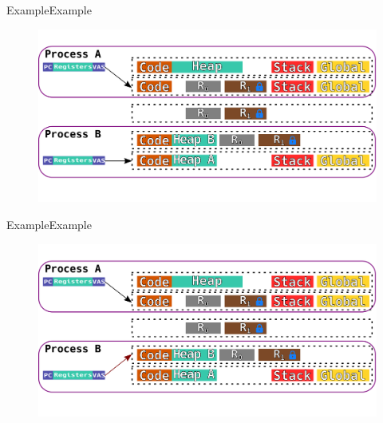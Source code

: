 \documentclass[10pt]{beamer}
\begin{document}
\begin{frame}{Example}{Example}
  \begin{figure}[ht]
    \centering
    \includegraphics[width=1\textwidth, keepaspectratio=true]{images/spacejmp_example_n.png}
  \end{figure}
\end{frame}

\begin{frame}{Example}{Example}
  \begin{figure}[ht]
    \centering
    \includegraphics[width=1\textwidth, keepaspectratio=true]{images/spacejmp_example_o.png}
  \end{figure}
\end{frame}

\end{document}
